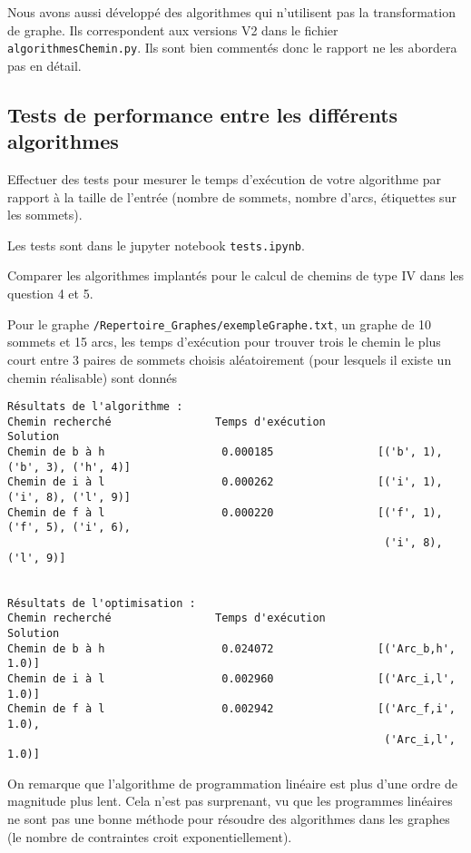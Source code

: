 Nous avons aussi développé des algorithmes qui n'utilisent pas la transformation
de graphe. Ils correspondent aux versions V2 dans le fichier
\verb|algorithmesChemin.py|. Ils sont bien commentés donc le rapport ne les
abordera pas en détail.

\subsection{Tests de performance entre les différents algorithmes}
\label{sec:tests}

\begin{question}
  Effectuer des tests pour mesurer le temps d'exécution de votre algorithme par
  rapport à la taille de l'entrée (nombre de sommets, nombre d'arcs, étiquettes
  sur les sommets).
\end{question}

\begin{reponse}
  Les tests sont dans le jupyter notebook \verb|tests.ipynb|.
\end{reponse}

\begin{question}
  Comparer les algorithmes implantés pour le calcul de chemins de type IV dans
  les question 4 et 5.
\end{question}

\begin{reponse}
  Pour le graphe \verb|/Repertoire_Graphes/exempleGraphe.txt|, un graphe de 10
  sommets et 15 arcs, les temps d'exécution pour trouver trois le chemin le plus
  court entre 3 paires de sommets choisis aléatoirement (pour lesquels il existe
  un chemin réalisable) sont donnés

\begin{verbatim}
Résultats de l'algorithme :
Chemin recherché                Temps d'exécution               Solution
Chemin de b à h                  0.000185                [('b', 1), ('b', 3), ('h', 4)]
Chemin de i à l                  0.000262                [('i', 1), ('i', 8), ('l', 9)]
Chemin de f à l                  0.000220                [('f', 1), ('f', 5), ('i', 6),
                                                          ('i', 8), ('l', 9)]


Résultats de l'optimisation :
Chemin recherché                Temps d'exécution               Solution
Chemin de b à h                  0.024072                [('Arc_b,h', 1.0)]
Chemin de i à l                  0.002960                [('Arc_i,l', 1.0)]
Chemin de f à l                  0.002942                [('Arc_f,i', 1.0),
                                                          ('Arc_i,l', 1.0)]
\end{verbatim}

  On remarque que l'algorithme de programmation linéaire est plus d'une ordre de
  magnitude plus lent. Cela n'est pas surprenant, vu que les programmes
  linéaires ne sont pas une bonne méthode pour résoudre des algorithmes dans les
  graphes (le nombre de contraintes croit exponentiellement).
\end{reponse}


